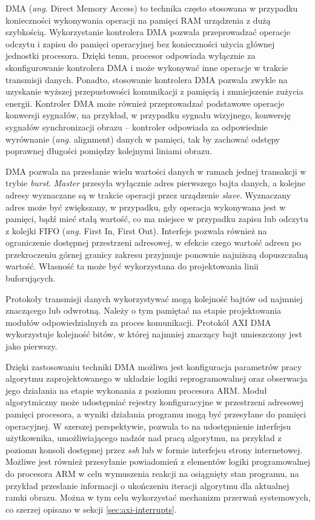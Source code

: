 DMA (\emph{ang.} Direct Memory Access) to technika często stosowana w przypadku konieczności wykonywania operacji na pamięci RAM urządzenia z dużą szybkością. %
Wykorzystanie kontrolera DMA pozwala przeprowadzać operacje odczytu i zapisu do pamięci operacyjnej bez konieczności użycia głównej jednostki procesora. 
Dzięki temu, procesor odpowiada wyłącznie za skonfigurowanie kontrolera DMA i może wykonywać inne operacje w trakcie transmisji danych. 
Ponadto, stosowanie kontrolera DMA pozwala zwykle na uzyskanie wyższej przepustowości komunikacji z pamięcią i zmniejszenie zużycia energii.
Kontroler DMA może również przeprowadzać podstawowe operacje konwersji sygnałów, na przykład, w przypadku sygnału wizyjnego, konwersję sygnałów synchronizacji obrazu -- kontroler odpowiada za odpowiednie wyrównanie (\emph{ang.} alignment) danych w pamięci, tak by zachować odstępy poprawnej długości pomiędzy kolejnymi liniami obrazu. %

DMA pozwala na przesłanie wielu wartości danych w ramach jednej transakcji w trybie \emph{burst}. 
\emph{Master} przesyła wyłącznie adres pierwszego bajta danych, a kolejne adresy wyznaczane są w trakcie operacji przez urządzenie \emph{slave}.
Wyznaczany adres może być zwiększany, w przypadku, gdy operacja wykonywana jest w pamięci, bądź mieć stałą wartość, co ma miejsce w przypadku zapisu lub odczytu z kolejki FIFO (\emph{ang.} First In, First Out). 
Interfejs pozwala również na ograniczenie dostępnej przestrzeni adresowej, w efekcie czego wartość adresu po przekroczeniu górnej granicy zakresu przyjmuje ponownie najniższą dopuszczalną wartość. 
Własność ta może być wykorzystana do projektowania linii buforujących.

Protokoły transmisji danych wykorzystywać mogą kolejność bajtów od najmniej znaczącego lub odwrotną. Należy o tym pamiętać na etapie projektowania modułów odpowiedzialnych za proces komunikacji. Protokół AXI DMA wykorzystuje kolejność bitów, w której najmniej znaczący bajt umieszczony jest jako pierwszy. %

Dzięki zastosowaniu techniki DMA możliwa jest konfiguracja parametrów pracy algorytmu zaprojektowanego w układzie logiki reprogramowalnej oraz obserwacja jego działania na etapie wykonania z poziomu procesora ARM. Moduł algorytmiczny może udostępniać rejestry konfiguracyjne w przestrzeni adresowej pamięci procesora, a wyniki działania programu mogą być przesyłane do pamięci operacyjnej.%
W szerszej perspektywie, pozwala to na udostępnienie interfejsu użytkownika, umożliwiającego nadzór nad pracą algorytmu, na przykład z poziomu konsoli dostępnej przez \emph{ssh} lub w formie interfejsu strony internetowej. 
Możliwe jest również przesyłanie powiadomień z elementów logiki programowalnej do procesora ARM w celu wymuszenia reakcji na osiągnięty stan programu, na przykład przesłanie informacji o ukończeniu iteracji algorytmu dla aktualnej ramki obrazu. %
Można w tym celu wykorzystać mechanizm przerwań systemowych, co szerzej opisano w sekcji \ref{sec:axi-interrupts}.

